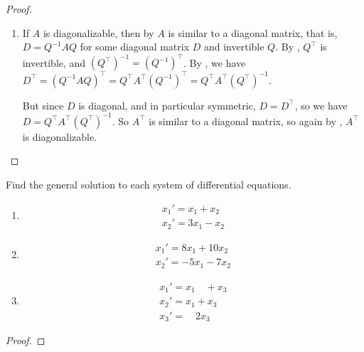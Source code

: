 \begin{proof}
\begin{enumerate}
\item
If \(A\) is diagonalizable, then by  \(A\) is similar to a diagonal matrix, that is, \(D = Q^{-1} A Q\) for some diagonal matrix \(D\) and invertible \(Q\).
By , \(Q^\top\) is invertible, and \((Q^{\top})^{-1} = (Q^{-1})^\top\).
By , we have \(D^\top = (Q^{-1} A Q)^\top = Q^\top A^\top (Q^{-1})^\top = Q^\top A^\top (Q^\top)^{-1}\).

But since \(D\) is diagonal, and in particular symmetric, \(D = D^\top\), so we have \(D = Q^\top A^\top (Q^\top)^{-1}\).
So \(A^\top\) is similar to a diagonal matrix, so again by , \(A^\top\) is diagonalizable.
\end{enumerate}
\end{proof}


\begin{exercise} \label{exercise 5.2.15}
Find the general solution to each system of differential equations.
\begin{enumerate}
\item 
\begin{align*}
    x_1' = x_1 + x_2 \\
    x_2' = 3x_1 - x_2
\end{align*}
\item
\begin{align*}
    x_1' = 8x_1 + 10x_2 \\
    x_2' = -5x_1 - 7x_2
\end{align*}

\item
\begin{align*}
    x_1' = x_1 \quad + x_3 \\
    x_2' = x_1 + x_3 \\
    x_3' = \quad 2 x_3
\end{align*}
\end{enumerate}
\end{exercise}

\begin{proof}
\end{proof}

